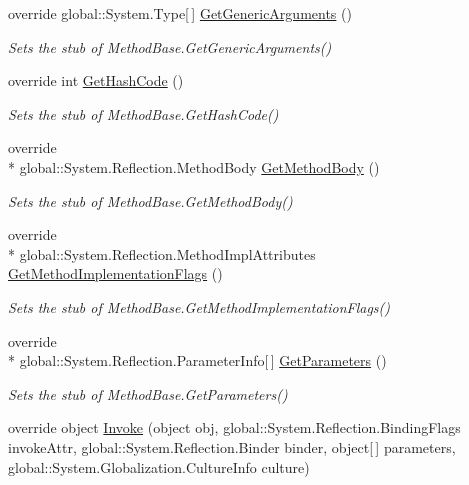 \begin{DoxyCompactItemize}
override global\-::\-System.\-Type\mbox{[}$\,$\mbox{]} \hyperlink{class_system_1_1_reflection_1_1_fakes_1_1_stub_method_base_a65076b3c5dd9402b8d06f4ecd095818e}{Get\-Generic\-Arguments} ()
\begin{DoxyCompactList}\small\item\em Sets the stub of Method\-Base.\-Get\-Generic\-Arguments()\end{DoxyCompactList}\item 
override int \hyperlink{class_system_1_1_reflection_1_1_fakes_1_1_stub_method_base_a63bd7ce5c7deaafdfdabf320c5a59762}{Get\-Hash\-Code} ()
\begin{DoxyCompactList}\small\item\em Sets the stub of Method\-Base.\-Get\-Hash\-Code()\end{DoxyCompactList}\item 
override \\*
global\-::\-System.\-Reflection.\-Method\-Body \hyperlink{class_system_1_1_reflection_1_1_fakes_1_1_stub_method_base_a09a8a8b1e92860f904a0d7692ab7a763}{Get\-Method\-Body} ()
\begin{DoxyCompactList}\small\item\em Sets the stub of Method\-Base.\-Get\-Method\-Body()\end{DoxyCompactList}\item 
override \\*
global\-::\-System.\-Reflection.\-Method\-Impl\-Attributes \hyperlink{class_system_1_1_reflection_1_1_fakes_1_1_stub_method_base_a90a6e20ed99eb7b7db91e70ae48269e6}{Get\-Method\-Implementation\-Flags} ()
\begin{DoxyCompactList}\small\item\em Sets the stub of Method\-Base.\-Get\-Method\-Implementation\-Flags()\end{DoxyCompactList}\item 
override \\*
global\-::\-System.\-Reflection.\-Parameter\-Info\mbox{[}$\,$\mbox{]} \hyperlink{class_system_1_1_reflection_1_1_fakes_1_1_stub_method_base_a863a61c232ca37dfcc8901e919d50823}{Get\-Parameters} ()
\begin{DoxyCompactList}\small\item\em Sets the stub of Method\-Base.\-Get\-Parameters()\end{DoxyCompactList}\item 
override object \hyperlink{class_system_1_1_reflection_1_1_fakes_1_1_stub_method_base_ade8114179fe7cf1db7402edb63e1cea5}{Invoke} (object obj, global\-::\-System.\-Reflection.\-Binding\-Flags invoke\-Attr, global\-::\-System.\-Reflection.\-Binder binder, object\mbox{[}$\,$\mbox{]} parameters, global\-::\-System.\-Globalization.\-Culture\-Info culture)

\end{DoxyCompactItemize}
